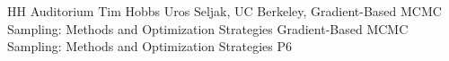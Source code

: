 \tablePlenary{} %
{HH Auditorium}	%
{Tim Hobbs}		%
{Uros Seljak, UC Berkeley, Gradient-Based MCMC Sampling: Methods and Optimization Strategies}	%
{Gradient-Based MCMC Sampling: Methods and Optimization Strategies}		%
{P6}		%
\\\hline
